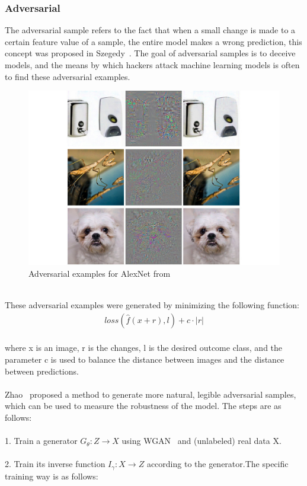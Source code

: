 \subsubsection{Adversarial}
The adversarial sample refers to the fact that when a small change is made to a certain feature value of a sample, the entire model makes a wrong prediction, this concept was proposed in Szegedy~\cite{szegedy2013intriguing}. The goal of adversarial samples is to deceive models, and the means by which hackers attack machine learning models is often to find these adversarial examples.
\begin{figure}[H]
\centering
\includegraphics[width=0.5\columnwidth]{gfx/adversarial-ostrich.jpg}
\caption{Adversarial examples for AlexNet from ~\cite{szegedy2013intriguing}}
\label{fig:Adversarial}
\end{figure}
~\\These adversarial examples were generated by minimizing the following function:
\begin{equation}
\begin{aligned}
loss(\hat{f}(x+r),l)+c\cdot|r|
\end{aligned}
\label{eqn:eq8}
\end{equation}
~\\where x is an image, r is the changes, l is the desired outcome class, and the parameter c is used to balance the distance between images and the distance between predictions. 
\\\\Zhao~\cite{zhao2017generating} proposed a method to generate more natural, legible adversarial samples, which can be used to measure the robustness of the model. The steps are as follows:
\\\\1. Train a generator $G_{\theta}:Z\to X$ using WGAN~\cite{arjovsky2017wasserstein} and (unlabeled) real data X.
\\\\2. Train its inverse function $I_{\gamma}:X\to Z$ according to the generator.The specific training way is as follows:
